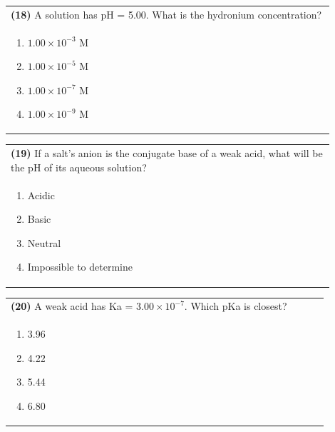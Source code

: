 \documentclass{article}
\begin{document}
\noindent\begin{tabular}{|p{0.9\linewidth}|}
\hline
\textbf{(18)} A solution has pH = 5.00. What is the hydronium concentration? \\[0.2cm]
\begin{minipage}{0.85\linewidth}
\begin{enumerate}[label=\alph*.]
\item $1.00\times10^{-3}$ M \item $1.00\times10^{-5}$ M \item $1.00\times10^{-7}$ M \item $1.00\times10^{-9}$ M
\end{enumerate}
\end{minipage}\\[0.2cm]
\hline
\end{tabular}

\noindent\begin{tabular}{|p{0.9\linewidth}|}
\hline
\textbf{(19)} If a salt's anion is the conjugate base of a weak acid, what will be the pH of its aqueous solution? \\[0.2cm]
\begin{minipage}{0.85\linewidth}
\begin{enumerate}[label=\alph*.]
\item Acidic \item Basic \item Neutral \item Impossible to determine
\end{enumerate}
\end{minipage}\\[0.2cm]
\hline
\end{tabular}

\noindent\begin{tabular}{|p{0.9\linewidth}|}
\hline
\textbf{(20)} A weak acid has Ka = $3.00\times10^{-7}$. Which pKa is closest? \\[0.2cm]
\begin{minipage}{0.85\linewidth}
\begin{enumerate}[label=\alph*.]
\item 3.96 \item 4.22 \item 5.44 \item 6.80
\end{enumerate}
\end{minipage}\\[0.2cm]
\hline
\end{tabular}
\newpage
\end{document}
